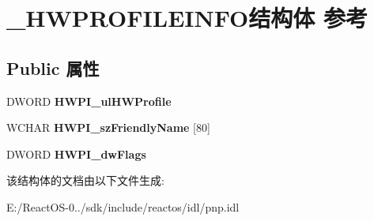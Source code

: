 \hypertarget{struct___h_w_p_r_o_f_i_l_e_i_n_f_o}{}\section{\+\_\+\+H\+W\+P\+R\+O\+F\+I\+L\+E\+I\+N\+F\+O结构体 参考}
\label{struct___h_w_p_r_o_f_i_l_e_i_n_f_o}
\subsection*{Public 属性}
\begin{DoxyCompactItemize}
\item 
\mbox{\label{struct___h_w_p_r_o_f_i_l_e_i_n_f_o_a0549d134a4de63e3ef0c53013384766a}} 
D\+W\+O\+RD {\bfseries H\+W\+P\+I\+\_\+ul\+H\+W\+Profile}
\item 
\mbox{\label{struct___h_w_p_r_o_f_i_l_e_i_n_f_o_a484d7447cf0d3e138577e85acfd1a343}} 
W\+C\+H\+AR {\bfseries H\+W\+P\+I\+\_\+sz\+Friendly\+Name} \mbox{[}80\mbox{]}
\item 
\mbox{\label{struct___h_w_p_r_o_f_i_l_e_i_n_f_o_ab01b6aec4537dc31e5978647a325dccc}} 
D\+W\+O\+RD {\bfseries H\+W\+P\+I\+\_\+dw\+Flags}
\end{DoxyCompactItemize}


该结构体的文档由以下文件生成\+:\begin{DoxyCompactItemize}
\item 
E\+:/\+React\+O\+S-\/0../sdk/include/reactos/idl/pnp.\+idl\end{DoxyCompactItemize}
